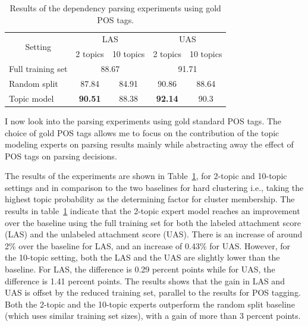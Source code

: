 \begin{table}[t!]
	\centering
	\begin{tabular}{l|cc|cc}
		\multicolumn{1}{c|}{\multirow{2}{*}{Setting}} & \multicolumn{2}{c|}{LAS}                                      & \multicolumn{2}{c}{UAS}                                     \\
		\multicolumn{1}{c|}{}                         & \multicolumn{1}{l}{2 topics} & \multicolumn{1}{r|}{10 topics} & \multicolumn{1}{l}{2 topics} & \multicolumn{1}{r}{10 topics} \\ \hline
		Full training set                             & \multicolumn{2}{c|}{88.67}                                    & \multicolumn{2}{c}{91.71}                                   \\
		Random split                                  & 87.84                        & 84.91                          & 90.86                        & 88.64                         \\
		Topic model                                   & \textbf{90.51}               & 88.38                          & \textbf{92.14}               & 90.3                          \\ \hline
	\end{tabular}
	\caption{Results of the dependency parsing experiments using gold POS tags.}
	\label{tab:tmvsfs}
\end{table}

I now look into the parsing experiments using gold standard POS tags. The choice of gold POS tags allows me to focus on the contribution of the topic modeling experts on parsing results mainly while abstracting away the effect of POS tags on parsing decisions. 

The results of the experiments are shown in Table~\ref{tab:tmvsfs}, for 2-topic and 10-topic settings and in comparison to the two baselines for hard clustering i.e., taking the highest topic probability as the determining factor for cluster membership. %
The results in table~\ref{tab:tmvsfs} indicate that the 2-topic expert model reaches an improvement over the baseline using the full training set for both the labeled attachment score (LAS) and the unlabeled attachment score (UAS). There is an increase of around 2\% over the baseline for LAS, and an increase of 0.43\% for UAS. However, for the 10-topic setting, both the LAS and the UAS are slightly lower than the baseline. For LAS, the difference is 0.29 percent points while for UAS, the difference is 1.41 percent points. The results shows that the gain in LAS and UAS is offset by the reduced training set, parallel to the results for POS tagging. Both the 2-topic and the 10-topic experts outperform the random split baseline (which uses similar training set sizes), with a gain of more than 3 percent points.

